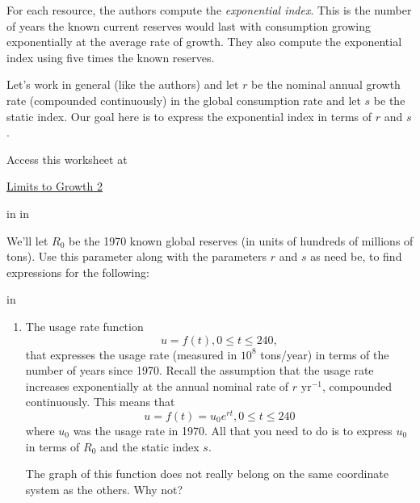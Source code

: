 \documentclass{ximera}
\newcommand{\pskip}{\vskip 0.1 in}
\begin{document}
For each resource, the authors compute the \emph{exponential index}. This is the number of years the known current reserves would last with consumption growing exponentially at the average rate of growth. They also compute the exponential index using five times the known reserves. 

\begin{question}   \label{Q34fratr5}
Let's work in general (like the authors) and let $r$ be the nominal annual growth rate (compounded continuously) in the global consumption rate and let $s$ be the static index. Our goal here is to express  the exponential index in terms of $r$ and $s$.  



 
\begin{onlineOnly}
    \begin{center}
\end{center}
\end{onlineOnly}

Access this worksheet at

\href{https://www.desmos.com/calculator/er2jq9vzeq}{Limits to Growth 2}

\pskip \pskip

We'll let $R_0$ be the 1970 known global reserves (in units of hundreds of millions of tons). Use this parameter along with the parameters $r$ and $s$ as need be, to find expressions for the following:

\pskip 

\begin{enumerate}

\item The usage rate function 
\[
     u = f(t) , 0\leq t \leq 240,
\]
that expresses the usage rate (measured in $10^8$ tons/year) in terms of the number of years since 1970. Recall the assumption that the usage rate increases exponentially at the annual nominal rate of $r \text{ yr}^{-1}$, compounded continuously. This means that
\[
    u  = f(t) = u_0 e^{rt}, 0\leq t \leq 240
\]
where $u_0$ was the usage rate in 1970. All that you need to do is to express $u_0$ in terms of $R_0$ and the static index $s$.


The graph of this function does not really belong on the same coordinate system as the others. Why not?


\end{enumerate}
\end{question}
\end{document}
